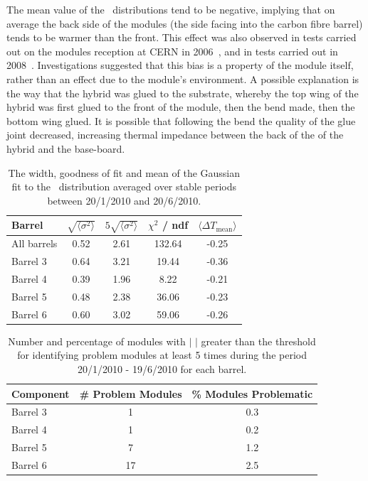 The mean value of the \deltat\ distributions tend to be negative, implying that
on average the back side of the modules (the side facing into the carbon fibre
barrel) tends to be warmer than the front. This effect was also observed in tests
carried out on the modules reception at CERN in 2006~\cite{Viehhauser:2006ix},
and in tests carried out in 2008~\cite{Shaw:1229428}. Investigations suggested
that this bias is a property of the module itself, rather than an effect due to
the module's environment. A possible explanation is the way that the hybrid was
glued to the substrate, whereby the top wing of the hybrid was first glued to the front of the
module, then the bend made, then the bottom wing glued. It is possible that
following the bend the quality of the glue joint decreased, increasing thermal
impedance between the back of the of the hybrid and the base-board.

\begin{table}
\centering
\begin{tabular}{ l  c  c  c  c }
\hline\hline
Barrel & $\sqrt{\langle \sigma ^ 2 \rangle }$ & $5\sqrt{\langle \sigma ^ 2 \rangle }$ & $\chi ^2 $  / ndf & $\langle \Delta T_{\mathrm{mean}} \rangle$ \\
\hline
All barrels & 0.52 & 2.61 & 132.64 & -0.25\\
Barrel 3 & 0.64 & 3.21 & 19.44 & -0.36 \\
Barrel 4 & 0.39 & 1.96 & 8.22 & -0.21 \\
Barrel 5 & 0.48 & 2.38 & 36.06 & -0.23 \\
Barrel 6 & 0.60 & 3.02 & 59.06 & -0.26 \\
\hline\hline
\end{tabular}
 \caption{The width, goodness of fit and mean of the Gaussian fit to the
 \deltat\ distribution averaged over stable periods between 20/1/2010 and 20/6/2010.}
	\label{table:dt_thresh}

\end{table}

\begin{table}
\centering
 \begin{tabular}{  l  c  c }
\hline\hline
Component & \# Problem Modules & \% Modules Problematic \\
\hline
Barrel 3 & 1 & 0.3 \\
Barrel 4 & 1 & 0.2 \\
Barrel 5 & 7 & 1.2 \\
Barrel 6 & 17 & 2.5 \\
\hline\hline
\end{tabular}
\caption{Number and percentage of modules with $|$ \deltat$|$ greater than the
threshold for identifying problem modules at least 5 times during the period
20/1/2010 - 19/6/2010 for each barrel.}
\label{table:dt_num}
\end{table}

